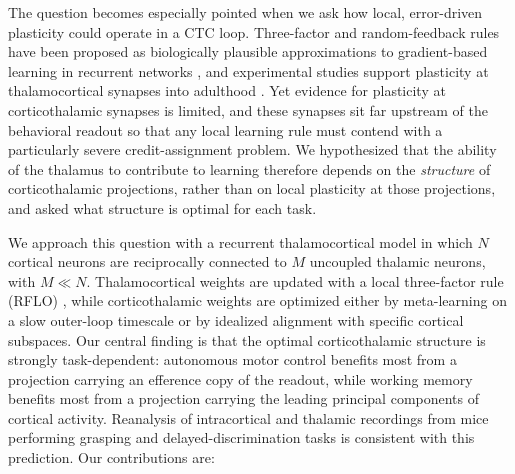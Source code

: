 The question becomes especially pointed when we ask how local, error-driven
plasticity could operate in a CTC loop. Three-factor and random-feedback
rules have been proposed as biologically plausible approximations to
gradient-based learning in recurrent networks \cite{murray2019local,
lillicrap2016random, gilra2017predicting, miconi2017biologically,
gerstner2018eligibility}, and experimental studies support plasticity at
thalamocortical synapses into adulthood
\cite{hasegawa2018thalamocortical}. Yet evidence for plasticity at
corticothalamic synapses is limited, and these synapses sit far upstream of
the behavioral readout so that any local learning rule must contend with a
particularly severe credit-assignment problem. We hypothesized that the
ability of the thalamus to contribute to learning therefore depends on the
\emph{structure} of corticothalamic projections, rather than on local
plasticity at those projections, and asked what structure is optimal for
each task.

We approach this question with a recurrent thalamocortical model in which
$N$ cortical neurons are reciprocally connected to $M$ uncoupled thalamic
neurons, with $M \ll N$. Thalamocortical weights are updated with a local
three-factor rule (RFLO) \cite{murray2019local, lillicrap2016random},
while corticothalamic weights are optimized either by meta-learning on a
slow outer-loop timescale \cite{wang2018prefrontal, hospedales2022meta} or
by idealized alignment with specific cortical subspaces. Our central
finding is that the optimal corticothalamic structure is strongly
task-dependent: autonomous motor control benefits most from a projection
carrying an efference copy of the readout, while working memory benefits
most from a projection carrying the leading principal components of
cortical activity. Reanalysis of intracortical and thalamic recordings
from mice performing grasping and delayed-discrimination tasks
\cite{sauerbrei2020cortical, guo2017maintenance} is consistent with this
prediction. Our contributions are:

